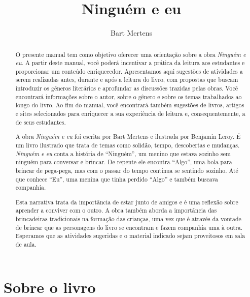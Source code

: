 \documentclass[11pt]{extarticle}
\newcommand{\AutorLivro}{Bart Mertens}
\newcommand{\TituloLivro}{Ninguém e eu}
\newcommand{\colaborador}{Ana Lancman}
\begin{document}
\title{\TituloLivro}
\author{\AutorLivro}
\def\authornotes{\colaborador}

\date{}
\maketitle


\tableofcontents
\pagebreak

\begin{abstract}
O presente manual tem como objetivo oferecer uma orientação sobre a obra \textit{Ninguém e eu}. A partir deste manual, você poderá incentivar a prática da leitura aos estudantes e proporcionar um conteúdo enriquecedor. Apresentamos aqui sugestões de atividades a serem realizadas antes, durante e após a leitura do livro, com propostas que buscam introduzir os gêneros literários e aprofundar as discussões trazidas pelas obras. Você encontrará informações sobre o autor, sobre o gênero e sobre os temas trabalhados ao longo do livro. Ao fim do manual, você encontrará também sugestões de livros, artigos e sites selecionados para enriquecer a sua experiência de leitura e, consequentemente, a de seus estudantes.

A obra \textit{Ninguém e eu} foi escrita por Bart Mertens e ilustrada por Benjamin Leroy. É um livro ilustrado que trata de temas como solidão, tempo, descobertas e mudanças. \textit{Ninguém e eu} conta a história de ``Ninguém'', um menino que estava sozinho sem ninguém para conversar e brincar. De repente ele encontra ``Algo'', uma bola para brincar de pega-pega, mas com o passar do tempo continua se sentindo sozinho. Até que conhece ``Eu'', uma menina que tinha perdido ``Algo'' e também buscava companhia.

Esta narrativa trata da importância de estar junto de amigos e é uma reflexão sobre aprender a conviver com o outro. 
A obra também aborda a importância das brincadeiras tradicionais na formação das crianças, uma vez que é através da vontade de brincar que as personagens do livro se encontram e fazem companhia uma à outra. Esperamos que as atividades sugeridas e o material indicado sejam proveitosos em sala de aula. 

\end{abstract}

\section{Sobre o livro}
\end{document}
